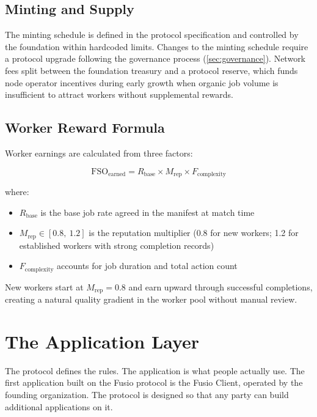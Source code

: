 \documentclass[10pt,twocolumn]{article}
\begin{document}
\subsection{Minting and Supply}

The minting schedule is defined in the protocol specification and controlled by the foundation within hardcoded limits. Changes to the minting schedule require a protocol upgrade following the governance process (\cref{sec:governance}). Network fees split between the foundation treasury and a protocol reserve, which funds node operator incentives during early growth when organic job volume is insufficient to attract workers without supplemental rewards.

\subsection{Worker Reward Formula}

Worker earnings are calculated from three factors:

\begin{equation}
  \text{FSO}_{\text{earned}} = R_{\text{base}} \times M_{\text{rep}} \times F_{\text{complexity}}
  \label{eq:reward}
\end{equation}

\noindent where:
\begin{itemize}[noitemsep,leftmargin=*,topsep=2pt]
  \item $R_{\text{base}}$ is the base job rate agreed in the manifest at match time
  \item $M_{\text{rep}} \in [0.8,\ 1.2]$ is the reputation multiplier (0.8 for new workers; 1.2 for established workers with strong completion records)
  \item $F_{\text{complexity}}$ accounts for job duration and total action count
\end{itemize}

New workers start at $M_{\text{rep}} = 0.8$ and earn upward through successful completions, creating a natural quality gradient in the worker pool without manual review.

\section{The Application Layer}
\label{sec:app}

The protocol defines the rules. The application is what people actually use. The first application built on the Fusio protocol is the Fusio Client, operated by the founding organization. The protocol is designed so that any party can build additional applications on it.
\end{document}
